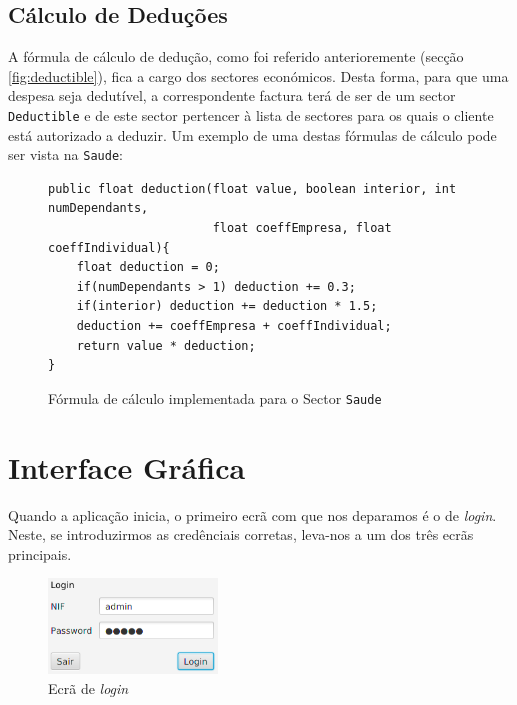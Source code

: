 \documentclass[12pt,a4paper]{report}
\begin{document}
\section{Cálculo de Deduções}
    A fórmula de cálculo de dedução, como foi referido anterioremente (secção
    \ref{fig:deductible}), fica a cargo dos sectores económicos. Desta forma,
    para que uma despesa seja dedutível, a correspondente factura terá de ser de um
    sector \texttt{Deductible}
    e de este sector pertencer à lista de sectores para os quais o cliente está
    autorizado a deduzir. Um exemplo de uma destas fórmulas de cálculo pode
    ser vista na \texttt{Saude}:
    \begin{figure}[h]
        \begin{verbatim}
public float deduction(float value, boolean interior, int numDependants,
                       float coeffEmpresa, float coeffIndividual){
    float deduction = 0;
    if(numDependants > 1) deduction += 0.3;
    if(interior) deduction += deduction * 1.5;
    deduction += coeffEmpresa + coeffIndividual;
    return value * deduction;
}
        \end{verbatim}
        \caption{Fórmula de cálculo implementada para o Sector
                    \texttt{Saude}}
        \label{fig:formulaDeduct}
    \end{figure}

\chapter{Interface Gráfica}

    Quando a aplicação inicia, o primeiro ecrã com que nos deparamos é o de
    \textit{login}. Neste, se introduzirmos as credênciais corretas, leva-nos a um
    dos três ecrãs principais.
\begin{figure}[h]
    \centering
    \includegraphics[width=0.4\textwidth]{./images/login.png}
    \caption{Ecrã de \textit{login}}
    \label{fig:login}
\end{figure}
\end{document}
